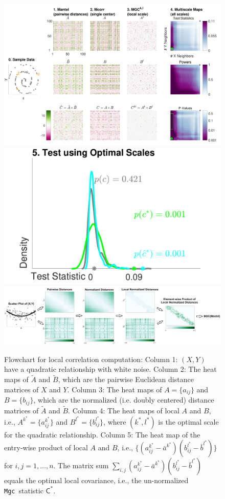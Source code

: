 \documentclass[11pt]{article}
\providecommand{\sct}[1]{{\sc \texttt{#1}}}
\newcommand{\G}{\mathsf{C}}
\newcommand{\Mgc}{\sct{Mgc}}
\begin{document}
\begin{figure}[htbp]
\includegraphics[width=1.0\textwidth]{Figures/FigA}
\includegraphics[width=1.0\textwidth]{Figures/FigB}
\includegraphics[width=1.0\textwidth]{Figures/FigC}
\caption{
Flowchart for local correlation computation: Column 1: $(X,Y)$ have a quadratic relationship with white noise. Column 2: The heat maps of $\tilde{A}$ and $\tilde{B}$, which are the pairwise Euclidean distance matrices of $X$ and $Y$. Column 3: The heat maps of $A=\{a_{ij}\}$ and $B=\{b_{ij}\}$, which are the normalized (i.e. doubly centered) distance matrices of $\tilde{A}$ and $\tilde{B}$. Column 4: The heat maps of local $A$ and $B$, i.e., $A^{k^{*}}=\{a^{k^{*}}_{ij}\}$ and $B^{l^{*}}=\{b^{l^{*}}_{ij}\}$, where $(k^{*},l^{*})$ is the optimal scale for the quadratic relationship. Column 5: The heat map of the entry-wise product of local $A$ and $B$, i.e., $\{(a_{ij}^{k^{*}}-\bar{a}^{k^{*}}) (b_{ij}^{l^{*}}-\bar{b}^{l^{*}})\}$ for $i,j=1,\ldots,n$. The matrix sum $\sum_{i,j}(a_{ij}^{k^{*}}-\bar{a}^{k^{*}}) (b_{ij}^{l^{*}}-\bar{b}^{l^{*}})$ equals the optimal local covariance, i.e., the un-normalized \Mgc~statistic $\G^{*}$. }
\label{fig:A}
\end{figure}
\end{document}

